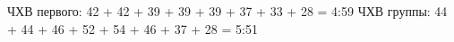 









ЧХВ первого: 42 + 42 + 39 + 39 + 39 + 37 + 33 + 28 = 4:59
ЧХВ группы: 44 + 44 + 46 + 52 + 54 + 46 + 37 + 28 = 5:51


    \FloatBarrier
